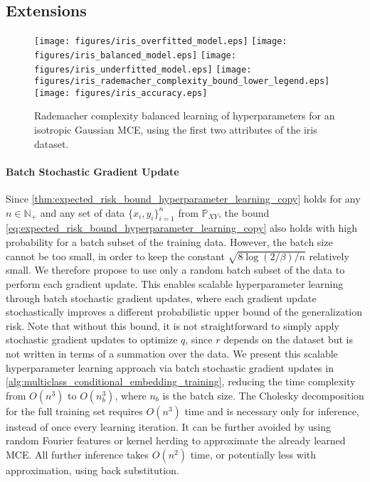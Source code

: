 \documentclass[twoside]{article}
\begin{document}
	\subsection{Extensions}
	\label{sec:extensions}

		\begin{figure*}[t]
			\centering
			\texttt{[image: figures/iris\_overfitted\_model.eps]}
			\texttt{[image: figures/iris\_balanced\_model.eps]}
			\texttt{[image: figures/iris\_underfitted\_model.eps]}
			\texttt{[image: figures/iris\_rademacher\_complexity\_bound\_lower\_legend.eps]}
			\texttt{[image: figures/iris\_accuracy.eps]}
			\caption{Rademacher complexity balanced learning of hyperparameters for an isotropic Gaussian \gls{MCE}, using the first two attributes of the iris dataset.}
			\label{fig:iris}
		\end{figure*}
		
		\paragraph{Batch Stochastic Gradient Update} Since \cref{thm:expected_risk_bound_hyperparameter_learning_copy} holds for any $n \in \mathbb{N}_{+}$ and any set of data $\{x_{i}, y_{i}\}_{i = 1}^{n}$ from $\mathbb{P}_{X Y}$, the bound \eqref{eq:expected_risk_bound_hyperparameter_learning_copy} also holds with high probability for a batch subset of the training data. However, the batch size cannot be too small, in order to keep the constant $\sqrt{8 \log{(2 / \beta)} / n}$ relatively small. We therefore propose to use only a random batch subset of the data to perform each gradient update. This enables scalable hyperparameter learning through batch stochastic gradient updates, where each gradient update stochastically improves a different probabilistic upper bound of the generalization risk. Note that without this bound, it is not straightforward to simply apply stochastic gradient updates to optimize $q$, since $r$ depends on the dataset but is not written in terms of a summation over the data. We present this scalable hyperparameter learning approach via batch stochastic gradient updates in \cref{alg:multiclass_conditional_embedding_training}, reducing the time complexity from $O(n^{3})$ to $O(n_{b}^{3})$, where $n_{b}$ is the batch size. The Cholesky decomposition for the full training set requires $O(n^{3})$ time and is necessary only for inference, instead of once every learning iteration. It can be further avoided by using random Fourier features \citep{rahimi2008random} or kernel herding \citep{chen2010super} to approximate the already learned \gls{MCE}. All further inference takes $O(n^{2})$ time, or potentially less with approximation, using back substitution. 
		
\end{document}
